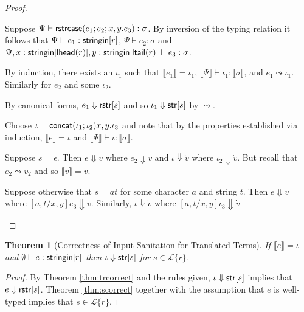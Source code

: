 \documentclass[11pt,leqno]{article}
\newtheorem{thm}{Theorem}
\theoremstyle{definition}
\newcommand{\Lagr}{\mathcal{L}}
\newcommand{\lang}[1]{\Lagr\{#1\}}
\newcommand{\sistr}[1]{{\sf rstr}[#1]}   \newcommand{\rstr}[1]{{\sf rstr}[#1]} %
\newcommand{\strin}[1]{\sistr{#1}}
\newcommand{\stringin}[1]{{\sf stringin}[#1]}
\renewcommand{\tstr}[1]{{{\sf str}[#1]}}
\newcommand{\tconcat}[2]{{\sf concat}(#1;#2)} \newcommand{\concat}[2]{{\sf concat}(#1;#2)} %
\newcommand{\sctx}{\Psi} %
\newcommand{\strcase}[3]{ {\sf rstrcase}(#1; #2; #3)}
\newcommand{\lhead}[1]{ {\sf lhead}(#1) }
\newcommand{\ltail}[1]{ {\sf ltail}(#1) }
\newcommand{\trden}[1]{\llbracket #1 \rrbracket} %
\newcommand{\treduces}{ \Downarrow }
\newcommand{\sreduces}{ \Downarrow }
\begin{document}
\begin{proof}
\begin{itemize}[label=$ $, itemsep=1ex]
Suppose $\sctx \vdash \strcase{e_1}{e_2}{x,y.e_3} : \sigma$.
By inversion of the typing relation it follows that
$\sctx \vdash e_1 : \stringin{r}$, $\sctx \vdash e_2 : \sigma$ and $\sctx, x : \stringin{\lhead{r}}, y : \stringin{\ltail{r}} \vdash e_3 : \sigma$.

By induction, there exists an $\iota_1$ such that $\trden{e_1} = \iota_1$,
$\trden{\sctx} \vdash \iota_1 : \trden{\sigma}$, and $e_1 \leadsto \iota_1$.
Similarly for $e_2$ and some $\iota_2$.

By canonical forms, $e_1 \sreduces \rstr{s}$ and so $\iota_1 \treduces \tstr{s}$ by $\leadsto$.

Choose $\iota = \tconcat{\iota_1}{\iota_2}{x,y.\iota_3}$ and note that by the properties established via induction,
$\trden{e} = \iota$ and $\trden{\sctx} \vdash \iota : \trden{\sigma}$.

Suppose $s = \epsilon$. Then $e \sreduces v$ where $e_2 \sreduces v$
and $\iota \treduces \dot{v}$ where $\iota_2 \treduces \dot{v}$.
But recall that $e_2 \leadsto v_2$ and so $\trden{v} = \dot{v}$.

Suppose otherwise that $s = at$ for some character $a$ and string $t$.
Then $e \sreduces v$ where $[a, t / x, y] e_3 \sreduces v$.
Similarly, $\iota \treduces \dot{v}$ where $[a, t / x, y] \iota_3 \treduces \dot{v}$

\end{itemize}
\end{proof}

\begin{thm}[Correctness of Input Sanitation for Translated Terms]\label{thm:main}
  If $\trden{e} = \iota$ and $\emptyset \vdash e : \stringin{r}$ then $\iota \sreduces \tstr{s}$
  for $s \in \lang{r}$.
\end{thm}
\begin{proof}
  By Theorem \ref{thm:trcorrect} and the rules given, $\iota \sreduces \tstr{s}$ implies that $e \sreduces \strin{s}$.
  Theorem \ref{thm:scorrect} together with the assumption that $e$ is well-typed implies that $s \in \lang{r}$.
\end{proof}

\end{document}
